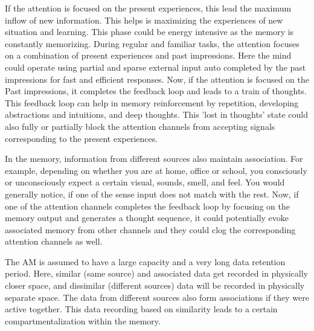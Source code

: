 \documentclass[reprint,amsmath,amssymb,apr,aip,onecolumn, 11pt]{revtex4-1}
\begin{document}
		 
		 If the attention is focused on the present experiences, this lead the maximum inflow of new information. This helps is maximizing the experiences of new situation and learning. This phase could be energy intensive as the memory is constantly memorizing. During regular and familiar tasks, the attention focuses on a  combination of present experiences and past impressions. Here the mind could operate using partial and sparse external input auto completed by the past impressions for fast and efficient responses. Now, if the attention is focused on the Past impressions, it completes the feedback loop and leads to a train of thoughts. This feedback loop can help in memory reinforcement by repetition, developing abstractions and intuitions, and deep thoughts. This 'lost in thoughts' state could also fully or partially block the attention channels from accepting signals corresponding to the present experiences.    

		
		In the memory, information from different sources also maintain association. For example, depending on whether you are at home, office or school, you consciously or unconsciously expect a certain visual, sounds, smell, and feel. You would generally notice, if one of the sense input does not match with the rest. Now, if one of the attention channels completes the feedback loop by focusing on the memory output and generates a thought sequence, it could potentially evoke associated memory from other channels and they could  clog the corresponding attention channels as well. 
		
		  The AM is assumed to have a large capacity and a very long data retention period. Here, similar (same source) and associated data get recorded in physically closer space, and dissimilar (different sources) data will be recorded in physically separate space. The data from different sources also form associations if they were active together. This data recording based on similarity leads to a certain compartmentalization within the memory.
		
		
		 
	
\end{document}
